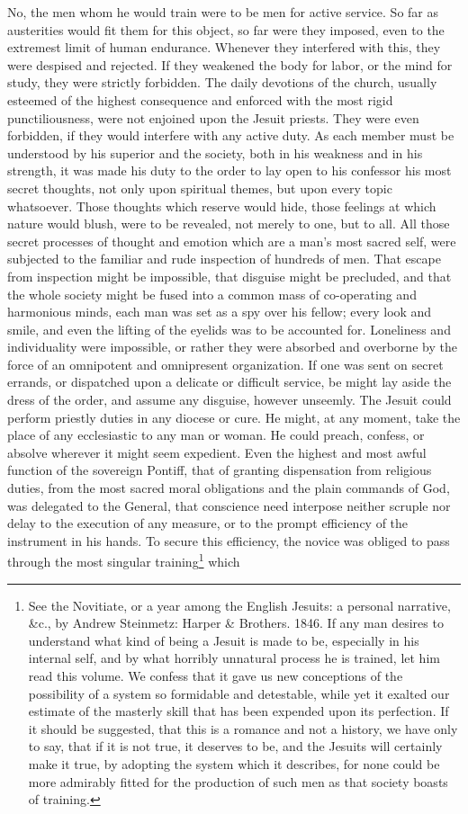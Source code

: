 \documentclass[]{book}
\let\rmarkdownfootnote\footnote%
\def\footnote{\protect\rmarkdownfootnote}
\begin{document}
No, the men whom he would train were to be men for active service. So far as austerities would fit them for this object, so far were they imposed, even to the extremest limit of human endurance. Whenever they interfered with this, they were despised and rejected. If they weakened the body for labor, or the mind for study, they were strictly forbidden. The daily devotions of the church, usually esteemed of the highest consequence and enforced with the most rigid punctiliousness, were not enjoined upon the Jesuit priests. They were even forbidden, if they would interfere with any active duty. As each member must be understood by his superior and the society, both in his weakness and in his strength, it was made his duty to the order to lay open to his confessor his most secret thoughts, not only upon spiritual themes, but upon every topic whatsoever. Those thoughts which reserve would hide, those feelings at which nature would blush, were to be revealed, not merely to one, but to all. All those secret processes of thought and emotion which are a man's most sacred self, were subjected to the familiar and rude inspection of hundreds of men. That escape from inspection might be impossible, that disguise might be precluded, and that the whole society might be fused into a common mass of co-operating and harmonious minds, each man was set as a spy over his fellow; every look and smile, and even the lifting of the eyelids was to be accounted for. Loneliness and individuality were impossible, or rather they were absorbed and overborne by the force of an omnipotent and omnipresent organization. If one was sent on secret errands, or dispatched upon a delicate or difficult service, be might lay aside the dress of the order, and assume any disguise, however unseemly. The Jesuit could perform priestly duties in any diocese or cure. He might, at any moment, take the place of any ecclesiastic to any man or woman. He could preach, confess, or absolve wherever it might seem expedient. Even the highest and most awful function of the sovereign Pontiff, that of granting dispensation from religious duties, from the most sacred moral obligations and the plain commands of God, was delegated to the General, that conscience need interpose neither scruple nor delay to the execution of any measure, or to the prompt efficiency of the instrument in his hands. To secure this efficiency, the novice was obliged to pass through the most singular training\footnote{See the Novitiate, or a year among the English Jesuits: a personal narrative, \&c., by Andrew Steinmetz: Harper \& Brothers. 1846. If any man desires to understand what kind of being a Jesuit is made to be, especially in his internal self, and by what horribly unnatural process he is trained, let him read this volume. We confess that it gave us new conceptions of the possibility of a system so formidable and detestable, while yet it exalted our estimate of the masterly skill that has been expended upon its perfection. If it should be suggested, that this is a romance and not a history, we have only to say, that if it is not true, it deserves to be, and the Jesuits will certainly make it true, by adopting the system which it describes, for none could be more admirably fitted for the production of such men as that society boasts of training.} which 
\end{document}
